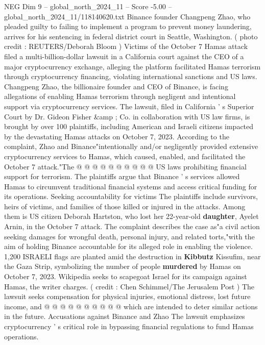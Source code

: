 \begin{textsample}{NEG Dim 9 – global\_north\_2024\_11 – Score -5.00 – global\_north\_2024\_11/118140620.txt}  \label{ex:f9_neg_207}
Binance founder Changpeng Zhao, who pleaded guilty to failing to implement a program to prevent money laundering, arrives for his sentencing in federal district court in Seattle, Washington. ( photo credit : REUTERS/Deborah Bloom ) Victims of the October 7 Hamas attack filed a multi-billion-dollar lawsuit in a California court against the CEO of a major cryptocurrency exchange, alleging the platform facilitated Hamas terrorism through cryptocurrency financing, violating international sanctions and US laws.
Changpeng Zhao, the billionaire founder and CEO of Binance, is facing allegations of enabling Hamas terrorism through negligent and intentional support via cryptocurrency services.
The lawsuit, filed in California ' s Superior Court by Dr.
Gideon Fisher \&amp ; Co. in collaboration with US law firms, is brought by over 100 plaintiffs, including American and Israeli citizens impacted by the devastating Hamas attacks on October 7, 2023.
According to the complaint, Zhao and Binance"intentionally and/or negligently provided extensive cryptocurrency services to Hamas, which caused, enabled, and facilitated the October 7 attack."The @ @ @ @ @ @ @ @ @ @ US laws prohibiting financial support for terrorism.
The plaintiffs argue that Binance ' s services allowed Hamas to circumvent traditional financial systems and access critical funding for its operations.
Seeking accountability for victims The plaintiffs include survivors, heirs of victims, and families of those killed or injured in the attacks.
Among them is US citizen Deborah Hartston, who lost her 22-year-old \textbf{daughter}, Ayelet Arnin, in the October 7 attack.
The complaint describes the case as"a civil action seeking damages for wrongful death, personal injury, and related torts,"with the aim of holding Binance accountable for its alleged role in enabling the violence. 1,200 ISRAELI flags are planted amid the destruction in \textbf{Kibbutz} Kissufim, near the Gaza Strip, symbolizing the number of people \textbf{murdered} by Hamas on October 7, 2023.
Wikipedia seeks to scapegoat Israel for its campaign against Hamas, the writer charges. ( credit : Chen Schimmel/The Jerusalem Post ) The lawsuit seeks compensation for physical injuries, emotional distress, lost future income, and @ @ @ @ @ @ @ @ @ @ which are intended to deter similar actions in the future.
Accusations against Binance and Zhao The lawsuit emphasizes cryptocurrency ' s critical role in bypassing financial regulations to fund Hamas operations.

\end{textsample}
